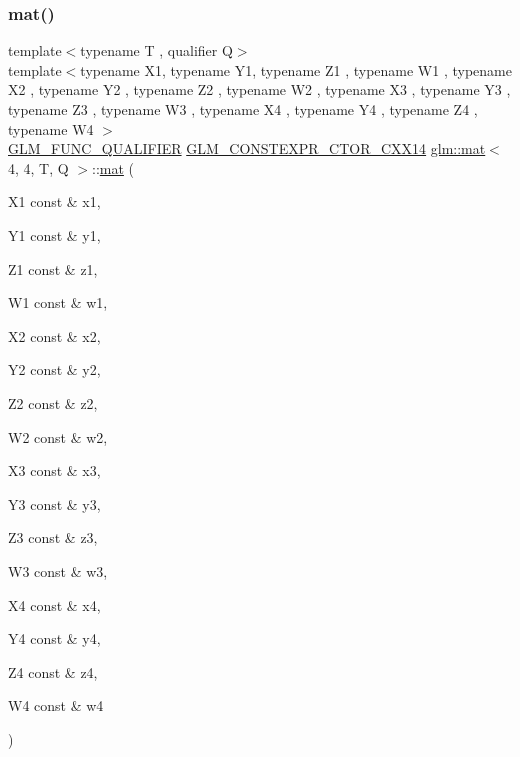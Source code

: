 \mbox{\label{structglm_1_1mat_3_014_00_014_00_01_t_00_01_q_01_4_ae64b907a3bd648bb5f89b20f1f06dd4c}} 
\subsubsection{\texorpdfstring{mat()}{mat()}\hspace{0.1cm}{\footnotesize\ttfamily [20/21]}}
{\footnotesize\ttfamily template$<$typename T , qualifier Q$>$ \\
template$<$typename X1, typename Y1, typename Z1 , typename W1 , typename X2 , typename Y2 , typename Z2 , typename W2 , typename X3 , typename Y3 , typename Z3 , typename W3 , typename X4 , typename Y4 , typename Z4 , typename W4 $>$ \\
\mbox{\hyperlink{setup_8hpp_a33fdea6f91c5f834105f7415e2a64407}{G\+L\+M\+\_\+\+F\+U\+N\+C\+\_\+\+Q\+U\+A\+L\+I\+F\+I\+ER}} \mbox{\hyperlink{setup_8hpp_a0900f9145e68bf6061b6f5e7be3fa751}{G\+L\+M\+\_\+\+C\+O\+N\+S\+T\+E\+X\+P\+R\+\_\+\+C\+T\+O\+R\+\_\+\+C\+X\+X14}} \mbox{\hyperlink{structglm_1_1mat}{glm\+::mat}}$<$ 4, 4, T, Q $>$\+::\mbox{\hyperlink{structglm_1_1mat}{mat}} (\begin{DoxyParamCaption}\item[{X1 const \&}]{x1,  }\item[{Y1 const \&}]{y1,  }\item[{Z1 const \&}]{z1,  }\item[{W1 const \&}]{w1,  }\item[{X2 const \&}]{x2,  }\item[{Y2 const \&}]{y2,  }\item[{Z2 const \&}]{z2,  }\item[{W2 const \&}]{w2,  }\item[{X3 const \&}]{x3,  }\item[{Y3 const \&}]{y3,  }\item[{Z3 const \&}]{z3,  }\item[{W3 const \&}]{w3,  }\item[{X4 const \&}]{x4,  }\item[{Y4 const \&}]{y4,  }\item[{Z4 const \&}]{z4,  }\item[{W4 const \&}]{w4 }\end{DoxyParamCaption})}


